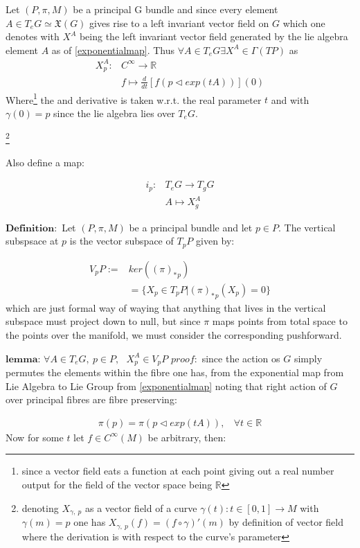 \documentclass[8pt, twocoloumn]{article}
\begin{document}
Let $(P, \pi, M)$ be a principal G bundle and since every element $A \in T_eG \simeq \mathfrak{X}(G)$ gives rise to a left invariant vector field on $G$ which one denotes with $X^A$ being the left invariant vector field generated by the lie algebra element $A$ as of \ref{exponentialmap}. Thus $\forall A \in T_eG \exists X^A \in \Gamma (TP)$ as
\begin{align}
X^A_p :& C^{\infty} \to \mathbb{R} \\ 
& f \mapsto \frac{d}{dt}[f(p \vartriangleleft exp(tA))] (0)
\end{align}
Where\footnote{since a vector field eats a function at each point giving out  a real number output for the field of the vector space being $\mathbb{R}$} the and derivative is taken w.r.t. the real parameter $t$ and with $\gamma(0)=p$ since the lie algebra lies over $T_eG$. 

 \footnote{denoting $X_{\gamma, \ p}$ as a vector field of a curve $\gamma (t): t \in [0,1] \to M$ with $\gamma(m)=p$ one has $X_{\gamma, \  p}(f) = (f \circ \gamma)'(m)$  by definition of vector field where the derivation is with respect to the curve's parameter} 
 
 Also define a map:
 
 \begin{align}
     i_p:& T_eG \to T_gG \\ 
     & A \mapsto X^A_g
 \end{align}
 
 $\textbf{Definition}:$ Let $(P, \pi, M)$ be a principal bundle and let $p \in P$. The vertical subspsace at $p$ is the vector subspace of $T_pP $ given by:
 
 \begin{align}
 V_pP:=& ker({{( \pi)}_{*}}_p) \\ 
 & = \{ X_p \in T_pP | {{{( \pi)}_{*}}_p(X_p)=0} \}
 \end{align}
 which are just formal way of waying that anything that lives in the vertical subspace must project down to null, but since $\pi$ maps points from total space to the points over the manifold, we must consider the corresponding pushforward. 
 
 $\textbf{lemma:}$ $\forall A \in T_eG, \ p\in P, \ \ \ X^A_p \in V_pP $ 
 $proof:$ since the action os $G$ simply permutes the elements within the fibre one has, from the exponential map from Lie Algebra to Lie Group from \ref{exponentialmap} noting that right action of $G$ over principal fibres are fibre preserving:
 
 \begin{align}
 \pi(p) = \pi(p \vartriangleleft exp(tA)), \ \ \ \ \forall t \in \mathbb{R}
 \end{align}
 Now for some $t$ let $f \in C^{\infty}(M)$ be arbitrary, then:
 
\end{document}
